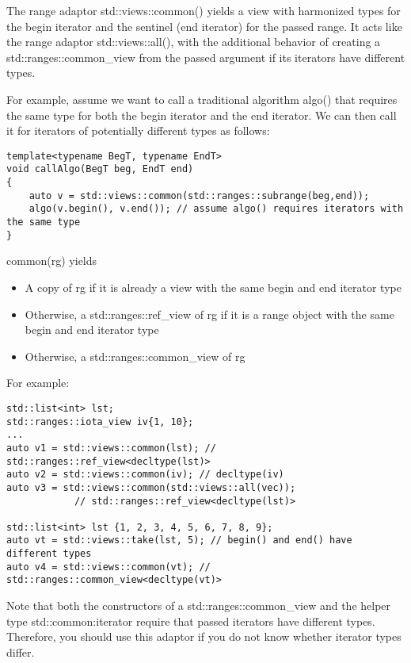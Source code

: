 The range adaptor std::views::common() yields a view with harmonized types for the begin iterator and the sentinel (end iterator) for the passed range. It acts like the range adaptor std::views::all(), with the additional behavior of creating a std::ranges::common\_view from the passed argument if its iterators have different types.

For example, assume we want to call a traditional algorithm algo() that requires the same type for both the begin iterator and the end iterator. We can then call it for iterators of potentially different types as follows:

\begin{lstlisting}[style=styleCXX]
template<typename BegT, typename EndT>
void callAlgo(BegT beg, EndT end)
{
	auto v = std::views::common(std::ranges::subrange(beg,end));
	algo(v.begin(), v.end()); // assume algo() requires iterators with the same type
}
\end{lstlisting}

common(rg) yields

\begin{itemize}
\item
A copy of rg if it is already a view with the same begin and end iterator type

\item
Otherwise, a std::ranges::ref\_view of rg if it is a range object with the same begin and end iterator type

\item
Otherwise, a std::ranges::common\_view of rg
\end{itemize}

For example:

\begin{lstlisting}[style=styleCXX]
std::list<int> lst;
std::ranges::iota_view iv{1, 10};
...
auto v1 = std::views::common(lst); // std::ranges::ref_view<decltype(lst)>
auto v2 = std::views::common(iv); // decltype(iv)
auto v3 = std::views::common(std::views::all(vec));
			// std::ranges::ref_view<decltype(lst)>
			
std::list<int> lst {1, 2, 3, 4, 5, 6, 7, 8, 9};
auto vt = std::views::take(lst, 5); // begin() and end() have different types
auto v4 = std::views::common(vt); // std::ranges::common_view<decltype(vt)>
\end{lstlisting}

Note that both the constructors of a std::ranges::common\_view and the helper type std::common:iterator require that passed iterators have different types. Therefore, you should use this adaptor if you do not know whether iterator types differ.











